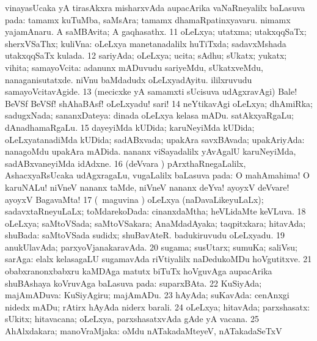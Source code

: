 {{ vinayasUcaka yA tirasAkxra
misharxvAda aupacArika vaNaRneyalilx baLasuva pada: 
tamamx kuTuMba, saMsAra; tamamx dhamaRpatinxyavaru. 
nimamx yajamAnaru.  A saMBAvita; A gaqhasathx. 
\num{11} oLeLxya; utatxma; utakxqqSaTx; sherxVSaThx; kuliVna:  oLeLxya manetanadalilx huTiTxda; sadavxMshada utakxqqSaTx kulada. 
\hypertarget{good(1)12}{}
\num{12} sariyAda; oLeLxya; ucita;
sAdhu; sUkatx; yukatx; vihita; samayoVcita: 
adanunx mADuvudu sariyeMdu, sUkatxveMdu, nanaganisutatxde.  niVnu baMdadudx oLeLxyadAyitu. 
ililxruvudu samayoVcitavAgide. 
\num{13} (mecicxke yA samamxti sUcisuva udAgxravAgi) Bale! BeVSf BeVSf! shAhaBAsf! oLeLxyadu! sari! 
\num{14} neYtikavAgi oLeLxya; dhAmiRka; sadugxNada; sananxDateya:  dinada oLeLxya kelasa mADu.  satAkxyaRgaLu; dAnadhamaRgaLu. 
\num{15} dayeyiMda kUDida; karuNeyiMda kUDida; oLeLxyatanadiMda kUDida; sadABxvada; upakAra savxBAvada; upakAriyAda:  nanagoMdu
upakAra mADida.  nananx viSayadalilx yAvAgalU
karuNeyiMda, sadABxvaneyiMda idAdxne. 
\num{16} (deVvara \vi) pArxthaRnegaLalilx, AshacxyaRsUcaka udAgxragaLu, \mo vugaLalilx baLasuva pada:
 O mahAmahima!
O karuNALu! niVneV nananx taMde, niVneV nananx deYva!  ayoyxV deVvare! ayoyxV BagavaMta! 
\num{17} (\kanmu\ maguvina \vi) oLeLxya (naDavaLikeyuLaLx); sadavxtaRneyuLaLx; toMdarekoDada:
 cinanxdaMtha; heVLidaMte keVLuva. 
\num{18} oLeLxya; saMtoVSada; saMtoVSakara; AnaMdadAyaka; taqpitxkara; hitavAda; shuBada:
 saMtoVSada sudidx; shuBavAteR. 
badukiruvudu oLeLxyadu. 
\num{19} anukUlavAda; parxyoVjanakaravAda. 
\num{20} sugama; susUtarx; sumuKa; saliVsu; sarAga: 
elalx kelasagaLU sugamavAda riVtiyalilx naDedukoMDu hoVgutitxve. 
\num{21} obabxranonxbabxru kaMDAga matutx biTuTx hoVguvAga aupacArika shuBAshaya koVruvAga baLasuva pada:  suparxBAta. 
\num{22} KuSiyAda; majAmADuva:
 KuSiyAgiru; majAmADu. 
\num{23} hAyAda; suKavAda:
 cenAnxgi nidedx mADu; rAtirx hAyAda niderx barali.
\num{24} oLeLxya; hitavAda; parxshasatx:  sUkitx;
hitavacana; oLeLxya, parxshasatxvAda gAde yA vacana. 
\num{25} AhAlxdakara;
manoVraMjaka:  oMdu nATakadaMteyeV, nATakadaSeTxV
}}
